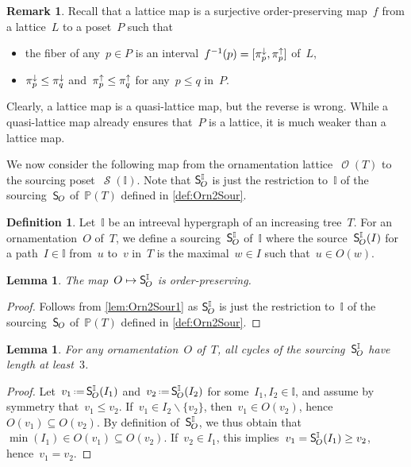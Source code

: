 \documentclass{amsart}
\newtheorem{lemma}[theorem]{Lemma}
\theoremstyle{definition}
\newtheorem{definition}[theorem]{Definition}
\newtheorem{remark}[theorem]{Remark}
\renewcommand{\c}[1]{\mathcal{#1}} %
\newcommand{\ssm}{\smallsetminus} %
\newcommand{\eqdef}{\mbox{\,\raisebox{0.2ex}{\scriptsize\ensuremath{\mathrm:}}\ensuremath{=}\,}} %
\newcommand{\projDown}[1]{\smash{\pi^\downarrow_{#1}}} %
\newcommand{\projUp}[1]{\smash{\pi^\uparrow_{#1}}} %
\newcommand{\mymap}[2]{\mathsf{#1}_{\hspace{-.7pt}#2}}
\DeclareMathOperator{\Orn}{\c{O}}  %
\DeclareMathOperator{\Sour}{\mathcal{S}}  %
\newcommand{\sour}[1]{\mymap{S}{#1}}  %
\newcommand{\II}{\mathbb I} %
\newcommand{\PP}{\mathbb P} %
\begin{document}
\begin{remark}
Recall that a lattice map is a surjective order-preserving map~$f$ from a lattice~$L$ to a poset~$P$ such that
\begin{itemize}
\item the fiber of any~$p \in P$ is an interval~$f^{-1}(p) = [\projDown{p}, \projUp{p}]$ of~$L$,
\item $\projDown{p} \le \projDown{q}$ and~$\projUp{p} \le \projUp{q}$ for any~$p \le q$ in~$P$.
\end{itemize}
Clearly, a lattice map is a quasi-lattice map, but the reverse is wrong.
While a quasi-lattice map already ensures that~$P$ is a lattice, it is much weaker than a lattice map.
\end{remark}

We now consider the following map from the ornamentation lattice~$\Orn(T)$ to the sourcing poset~$\Sour(\II)$.
Note that $\sour{O}^\II$ is just the restriction to~$\II$ of the sourcing~$\sour{O}$ of~$\PP(T)$ defined in \cref{def:Orn2Sour}.

\begin{definition}
\label{def:Orn2SourIntreeval}
Let~$\II$ be an intreeval hypergraph of an increasing tree~$T$.
For an ornamentation~$O$ of~$T$, we define a sourcing~$\sour{O}^\II$ of~$\II$ where the source~$\sour{O}^\II(I)$ for a path~$I \in \II$ from~$u$ to~$v$ in~$T$ is the maximal~$w \in I$ such that~$u \in O(w)$.
\end{definition}

\begin{lemma}
\label{lem:Orn2SourIntreeval1}
The map~$O \mapsto \sour{O}^\II$ is order-preserving.
\end{lemma}

\begin{proof}
Follows from \cref{lem:Orn2Sour1} as $\sour{O}^\II$ is just the restriction to~$\II$ of the sourcing~$\sour{O}$ of~$\PP(T)$ defined in \cref{def:Orn2Sour}.
\end{proof}

\begin{lemma}
\label{lem:Orn2SourIntreeval2}
For any ornamentation~$O$ of~$T$, all cycles of the sourcing~$\sour{O}^\II$ have length at least~$3$.
\end{lemma}

\begin{proof}
Let~$v_1 \eqdef \sour{O}^\II(I_1)$ and~$v_2 \eqdef \sour{O}^\II(I_2)$ for some~$I_1,I_2 \in \II$, and assume by symmetry that~${v_1 \le v_2}$.
If~$v_1 \in I_2 \ssm \{v_2\}$, then~$v_1 \in O(v_2)$, hence~$O(v_1) \subseteq O(v_2)$.
By definition of~$\sour{O}^\II$, we thus obtain that~$\min(I_1) \in O(v_1) \subseteq O(v_2)$.
If~$v_2 \in I_1$, this implies~$v_1 = \sour{O}^\II(I_1) \ge v_2$, hence~${v_1 = v_2}$.
\end{proof}
\end{document}
